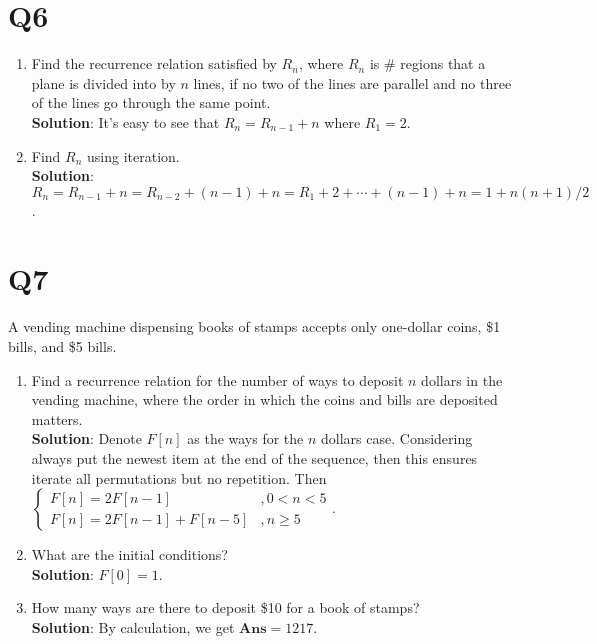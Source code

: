\documentclass[a4paper,11pt]{article}
\newenvironment{qparts}{\begin{enumerate}[{(}a{)}]}{\end{enumerate}}
\newenvironment{solution}{{\\\bf Solution}:}{\smallskip}
\begin{document}
\section*{Q6}
\begin{qparts}
    
    \item Find the recurrence relation satisﬁed by $R_n$, where $R_n$ is $\#$
    regions that a plane is divided into by $n$ lines, if no two of the
    lines are parallel and no three of the lines go through the same
    point.
    \begin{solution}
        It's easy to see that $R_{n}=R_{n-1}+n$ where $R_1=2$. 
    \end{solution}
    
    \item Find $R_n$ using iteration.
    \begin{solution}
        $R_{n}=R_{n-1}+n=R_{n-2}+(n-1)+n=R_1+2+ \cdots +(n-1)+n=1+n(n+1) / 2$.
    \end{solution}
\end{qparts}

\section*{Q7}
A vending machine dispensing books of stamps accepts only
one-dollar coins, \$1 bills, and \$5 bills.
\begin{qparts}
    
    \item Find a recurrence relation for the number of ways to deposit $n$
    dollars in the vending machine, where the order in which the
    coins and bills are deposited matters.
    \begin{solution}
        Denote $F[n]$ as the ways for the $n$ dollars case.
        Considering always put the newest item at the end of the sequence, then this ensures iterate all permutations but no repetition. Then $
        \begin{cases}
            F[n]=2F[n-1]&,0<n< 5\\
            F[n]=2F[n-1]+F[n-5]&,n\ge 5
        \end{cases}
        $.
    \end{solution}
    
    \item What are the initial conditions?
    \begin{solution}
        $F[0]=1$.
    \end{solution}
    \item How many ways are there to deposit \$10 for a book of stamps?
    \begin{solution}
        By calculation, we get $\textbf{Ans}=1217$.
    \end{solution}
\end{qparts}
\end{document}

